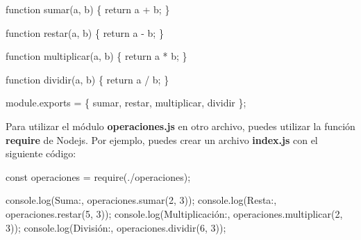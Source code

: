 \documentclass[
  a4paper,
  DIV=11,
  numbers=noendperiod,
  onepage,
  openany]{scrreprt}
\newenvironment{Shaded}{\begin{snugshade}}{\end{snugshade}}
\newcommand{\AttributeTok}[1]{\textcolor[rgb]{0.40,0.45,0.13}{#1}}
\newcommand{\BuiltInTok}[1]{\textcolor[rgb]{0.00,0.23,0.31}{#1}}
\newcommand{\ControlFlowTok}[1]{\textcolor[rgb]{0.00,0.23,0.31}{#1}}
\newcommand{\DecValTok}[1]{\textcolor[rgb]{0.68,0.00,0.00}{#1}}
\newcommand{\FunctionTok}[1]{\textcolor[rgb]{0.28,0.35,0.67}{#1}}
\newcommand{\KeywordTok}[1]{\textcolor[rgb]{0.00,0.23,0.31}{#1}}
\newcommand{\NormalTok}[1]{\textcolor[rgb]{0.00,0.23,0.31}{#1}}
\newcommand{\OperatorTok}[1]{\textcolor[rgb]{0.37,0.37,0.37}{#1}}
\newcommand{\PreprocessorTok}[1]{\textcolor[rgb]{0.68,0.00,0.00}{#1}}
\newcommand{\StringTok}[1]{\textcolor[rgb]{0.13,0.47,0.30}{#1}}
\begin{document}
\begin{Shaded}
\begin{Highlighting}[]
\KeywordTok{function} \FunctionTok{sumar}\NormalTok{(a}\OperatorTok{,}\NormalTok{ b) \{}
  \ControlFlowTok{return}\NormalTok{ a }\OperatorTok{+}\NormalTok{ b}\OperatorTok{;}
\NormalTok{\}}

\KeywordTok{function} \FunctionTok{restar}\NormalTok{(a}\OperatorTok{,}\NormalTok{ b) \{}
  \ControlFlowTok{return}\NormalTok{ a }\OperatorTok{{-}}\NormalTok{ b}\OperatorTok{;}
\NormalTok{\}}

\KeywordTok{function} \FunctionTok{multiplicar}\NormalTok{(a}\OperatorTok{,}\NormalTok{ b) \{}
  \ControlFlowTok{return}\NormalTok{ a }\OperatorTok{*}\NormalTok{ b}\OperatorTok{;}
\NormalTok{\}}

\KeywordTok{function} \FunctionTok{dividir}\NormalTok{(a}\OperatorTok{,}\NormalTok{ b) \{}
  \ControlFlowTok{return}\NormalTok{ a }\OperatorTok{/}\NormalTok{ b}\OperatorTok{;}
\NormalTok{\}}

\NormalTok{module}\OperatorTok{.}\AttributeTok{exports} \OperatorTok{=}\NormalTok{ \{}
\NormalTok{  sumar}\OperatorTok{,}
\NormalTok{  restar}\OperatorTok{,}
\NormalTok{  multiplicar}\OperatorTok{,}
\NormalTok{  dividir}
\NormalTok{\}}\OperatorTok{;}
\end{Highlighting}
\end{Shaded}

Para utilizar el módulo \textbf{operaciones.js} en otro archivo, puedes
utilizar la función \textbf{require} de Nodejs. Por ejemplo, puedes
crear un archivo \textbf{index.js} con el siguiente código:

\begin{Shaded}
\begin{Highlighting}[]
\KeywordTok{const}\NormalTok{ operaciones }\OperatorTok{=} \PreprocessorTok{require}\NormalTok{(}\StringTok{\textquotesingle{}./operaciones\textquotesingle{}}\NormalTok{)}\OperatorTok{;}

\BuiltInTok{console}\OperatorTok{.}\FunctionTok{log}\NormalTok{(}\StringTok{\textquotesingle{}Suma:\textquotesingle{}}\OperatorTok{,}\NormalTok{ operaciones}\OperatorTok{.}\FunctionTok{sumar}\NormalTok{(}\DecValTok{2}\OperatorTok{,} \DecValTok{3}\NormalTok{))}\OperatorTok{;}
\BuiltInTok{console}\OperatorTok{.}\FunctionTok{log}\NormalTok{(}\StringTok{\textquotesingle{}Resta:\textquotesingle{}}\OperatorTok{,}\NormalTok{ operaciones}\OperatorTok{.}\FunctionTok{restar}\NormalTok{(}\DecValTok{5}\OperatorTok{,} \DecValTok{3}\NormalTok{))}\OperatorTok{;}
\BuiltInTok{console}\OperatorTok{.}\FunctionTok{log}\NormalTok{(}\StringTok{\textquotesingle{}Multiplicación:\textquotesingle{}}\OperatorTok{,}\NormalTok{ operaciones}\OperatorTok{.}\FunctionTok{multiplicar}\NormalTok{(}\DecValTok{2}\OperatorTok{,} \DecValTok{3}\NormalTok{))}\OperatorTok{;}
\BuiltInTok{console}\OperatorTok{.}\FunctionTok{log}\NormalTok{(}\StringTok{\textquotesingle{}División:\textquotesingle{}}\OperatorTok{,}\NormalTok{ operaciones}\OperatorTok{.}\FunctionTok{dividir}\NormalTok{(}\DecValTok{6}\OperatorTok{,} \DecValTok{3}\NormalTok{))}\OperatorTok{;}
\end{Highlighting}
\end{Shaded}
\end{document}
